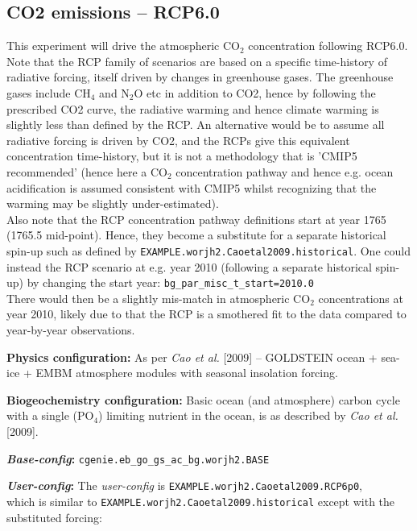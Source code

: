 \documentclass[10pt,twoside]{article}
\begin{document}
\subsection{CO2 emissions -- RCP6.0}\label{EXAMPLE.worjh2.Caoetal2009.RCP6p0}

This experiment will drive the atmospheric CO$_{2}$ concentration following RCP6.0.
\\Note that the RCP family of scenarios are based on a specific time-history of radiative forcing, itself driven by changes in greenhouse gases. The greenhouse gases include CH$_{4}$ and N$_{2}$O etc in addition to CO2, hence by following the prescribed CO2 curve, the radiative warming and hence climate warming is slightly less than defined by the RCP. An alternative would be to assume all radiative forcing is driven by CO2, and the RCPs give this equivalent concentration time-history, but it is not a methodology that is 'CMIP5 recommended' (hence here a CO$_{2}$ concentration pathway and hence e.g. ocean acidification is assumed consistent with CMIP5 whilst recognizing that the warming may be slightly under-estimated).
\\Also note that the RCP concentration pathway definitions start at year 1765 (1765.5 mid-point). Hence, they become a substitute for a separate historical spin-up such as defined by \texttt{EXAMPLE.worjh2.Caoetal2009.historical}. One could instead the RCP scenario at e.g. year 2010 (following a separate historical spin-up) by changing the start year:
\texttt{bg\_par\_misc\_t\_start=2010.0} \\There would then be a slightly mis-match in atmospheric CO$_{2}$ concentrations at year 2010, likely due to that the RCP is a smothered fit to the data compared to year-by-year observations.

\noindent \textbf{Physics configuration:} As per \textit{Cao et al.} [2009] -- GOLDSTEIN ocean + sea-ice + EMBM atmosphere modules with seasonal insolation forcing.

\noindent \textbf{Biogeochemistry configuration:} Basic ocean (and atmosphere) carbon cycle with a single (PO$_{4}$) limiting nutrient in the ocean, is as described by \textit{Cao et al.} [2009].

\noindent \textbf{\textit{Base-config}:} \texttt{cgenie.eb\_go\_gs\_ac\_bg.worjh2.BASE}

\noindent \textbf{\textit{User-config}:} The \textit{user-config} is \texttt{EXAMPLE.worjh2.Caoetal2009.RCP6p0},
\\ which is similar to \texttt{EXAMPLE.worjh2.Caoetal2009.historical} except with the substituted forcing:
\end{document}
